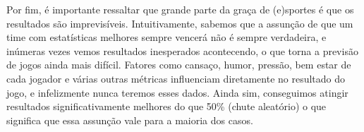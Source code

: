 \documentclass[12pt]{article}
\begin{document}
Por fim, é importante ressaltar que grande parte da graça de (e)sportes é que os resultados são imprevisíveis. Intuitivamente, sabemos que a assunção de que um time com estatísticas melhores sempre vencerá não é sempre verdadeira, e inúmeras vezes vemos resultados inesperados acontecendo, o que torna a previsão de jogos ainda mais difícil. Fatores como cansaço, humor, pressão, bem estar de cada jogador e várias outras métricas influenciam diretamente no resultado do jogo, e infelizmente nunca teremos esses dados. Ainda sim, conseguimos atingir resultados significativamente melhores do que 50\% (chute aleatório) o que significa que essa assunção vale para a maioria dos casos.

\def\UrlBreaks{\do\/\do-}


\end{document}
